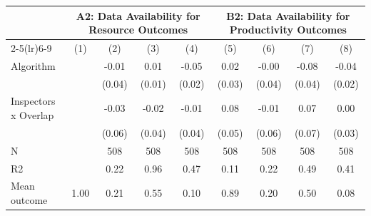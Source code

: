 \begin{tabular}{lcccc|cccc}
\midrule
            &\multicolumn{4}{c}{\textbf{A2: Data Availability for Resource Outcomes}}               &\multicolumn{4}{c}{\textbf{B2: Data Availability for Productivity Outcomes}}           \\\cmidrule(lr){2-5}\cmidrule(lr){6-9}
\multicolumn{1}{l}{} & (1) & (2) & (3) & (4) & (5) & (6) & (7) & (8) \\ \midrule
Algorithm   &                     &       -0.01         &        0.01         &       -0.05\sym{**} &        0.02         &       -0.00         &       -0.08\sym{**} &       -0.04\sym{**} \\
            &                     &      (0.04)         &      (0.01)         &      (0.02)         &      (0.03)         &      (0.04)         &      (0.04)         &      (0.02)         \\
\addlinespace
Inspectors x Overlap&                     &       -0.03         &       -0.02         &       -0.01         &        0.08         &       -0.01         &        0.07         &        0.00         \\
            &                     &      (0.06)         &      (0.04)         &      (0.04)         &      (0.05)         &      (0.06)         &      (0.07)         &      (0.03)         \\
\midrule
N           &                     &         508         &         508         &         508         &         508         &         508         &         508         &         508         \\
R2          &                     &        0.22         &        0.96         &        0.47         &        0.11         &        0.22         &        0.49         &        0.41         \\
Mean outcome&        1.00         &        0.21         &        0.55         &        0.10         &        0.89         &        0.20         &        0.50         &        0.08         \\
\bottomrule \end{tabular}
